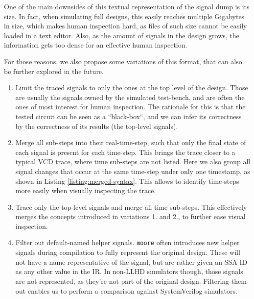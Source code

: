 
One of the main downsides of this textual representation of the signal dump is its size. In fact, when simulating full designs, this easily reaches multiple Gigabytes in size, which makes human inspection hard, as files of such size cannot be easily loaded in a text editor. Also, as the amount of signals in the design grows, the information gets too dense for an effective human inspection.

For those reasons, we also propose some variations of this format, that can also be further explored in the future.

\begin{enumerate}
    \item Limit the traced signals to only the ones at the top level of the design. Those are usually the signals owned by the simulated test-bench, and are often the ones of most interest for human inspection. The rationale for this is that the tested circuit can be seen as a “black-box“, and we can infer its correctness by the correctness of its results (the top-level signals).
    \item Merge all sub-steps into their real-time-step, such that only the final state of each signal is present for each time-step. This brings the trace closer to a typical VCD trace, where time sub-steps are not listed. Here we also group all signal changes that occur at the same time-step under only one timestamp, as shown in Listing \ref{listing:merged-syntax}. This allows to identify time-steps more easily when visually inspecting the trace.
    \item Trace only the top-level signals and merge all time sub-steps. This effectively merges the concepts introduced in variations 1. and 2., to further ease visual inspection.
    \item Filter out default-named helper signals. \texttt{moore} often introduces new helper signals during compilation to fully represent the original design. These will not have a name representative of the signal, but are rather given an SSA ID as any other value in the IR. In non-LLHD simulators though, those signals are not represented, as they're not part of the original design. Filtering them out enables us to perform a comparison against SystemVerilog simulators.
\end{enumerate}

